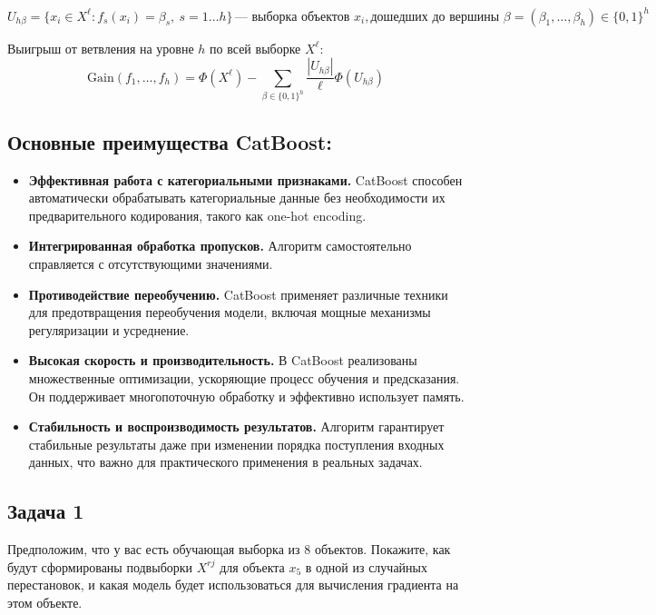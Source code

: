 $$
    U_{h\beta} = \{x_i \in X^\ell : f_s(x_i) = \beta_s, \ s = 1 \ldots h\} \, \text{— выборка объектов } x_i,
    \text{дошедших до вершины } \beta = (\beta_1, \ldots, \beta_h) \in \{0,1\}^h
$$

Выигрыш от ветвления на уровне \(h\) по всей выборке \(X^\ell\):
$$
    \text{Gain}(f_1, \ldots, f_h) = \Phi(X^\ell) - \sum_{\beta \in \{0,1\}^h} \frac{|U_{h\beta}|}{\ell} \Phi(U_{h\beta})
$$

\subsection*{Основные преимущества CatBoost:}

\begin{itemize}
    \item \textbf{Эффективная работа с категориальными признаками.} CatBoost способен автоматически обрабатывать категориальные данные без необходимости их предварительного кодирования, такого как one-hot encoding.

    \item \textbf{Интегрированная обработка пропусков.} Алгоритм самостоятельно справляется с отсутствующими значениями.
    \item \textbf{Противодействие переобучению.} CatBoost применяет различные техники для предотвращения переобучения модели, включая мощные механизмы регуляризации и усреднение.

    \item \textbf{Высокая скорость и производительность.} В CatBoost реализованы множественные оптимизации, ускоряющие процесс обучения и предсказания. Он поддерживает многопоточную обработку и эффективно использует память.

    \item \textbf{Стабильность и воспроизводимость результатов.} Алгоритм гарантирует стабильные результаты даже при изменении порядка поступления входных данных, что важно для практического применения в реальных задачах.

\end{itemize}

\subsection*{Задача 1}

Предположим, что у вас есть обучающая выборка из 8 объектов. Покажите, как будут сформированы подвыборки $X^{rj} $ для объекта $x_5$ в одной из случайных перестановок, и какая модель будет использоваться для вычисления градиента на этом объекте.

